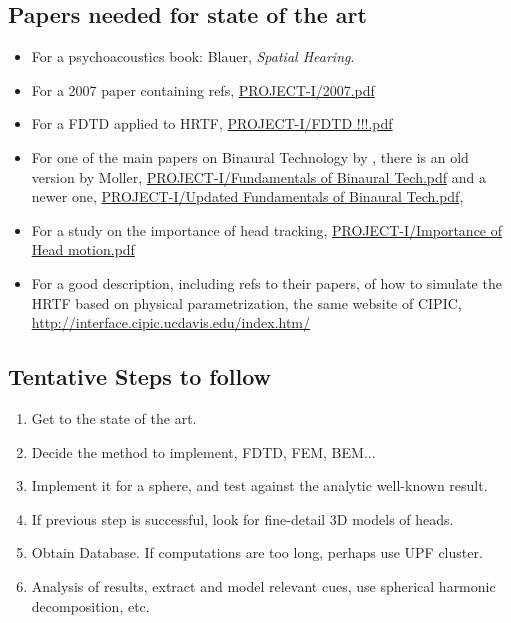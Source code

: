 \documentclass[12pt]{article}
\begin{document}
\subsection{Papers needed for state of the art}

\begin{itemize}
\item For a psychoacoustics book: Blauer, {\it Spatial Hearing}.

\item For a 2007 paper containing refs, \url{PROJECT-I/2007.pdf}

\item For a FDTD applied to HRTF, \url{PROJECT-I/FDTD !!!.pdf}

\item For one of the main papers on Binaural Technology by , there is
an old version by Moller, \url{PROJECT-I/Fundamentals of Binaural Tech.pdf}
and a newer one, \url{PROJECT-I/Updated Fundamentals of Binaural Tech.pdf},

\item For a study on the importance of head tracking, \url{PROJECT-I/Importance of Head motion.pdf}

\item For a good description, including refs to their papers, of how to simulate
the HRTF based on physical parametrization, the same website of CIPIC,
\url{http://interface.cipic.ucdavis.edu/index.htm/}

\end{itemize}


\subsection{Tentative Steps to follow}

\begin{enumerate}

\item Get to the state of the art.

\item Decide the method to implement, FDTD, FEM, BEM...

\item Implement it for a sphere, and test against the analytic well-known result.

\item If previous step is successful, look for fine-detail 3D models of heads.

\item Obtain Database. If computations are too long, perhaps use UPF cluster.

\item Analysis of results, extract and model relevant cues, use spherical harmonic
decomposition, etc.

\end{enumerate}
\end{document}
